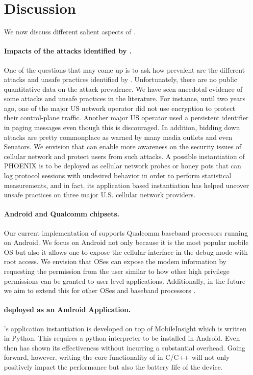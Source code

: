 \section{Discussion}
We now discuss different salient aspects of \system.
%


\paragraph{Impacts of the attacks identified by \system.}
One of the questions that may come up is to ask how prevalent
are the different attacks and unsafe practices identified by \system.
Unfortunately, there are no public quantitative data on the attack
prevalence. We have seen anecdotal evidence
of some attacks and unsafe practices
in the literature. For instance, until two years ago, one of the major
US network operator did not use  encryption to protect their control-plane traffic.
Another major US operator used a persistent identifier in paging messages even though
this is discouraged. In addition, bidding down attacks are pretty commonplace
as warned by many media outlets and even Senators. We envision that \system can enable
more awareness on the security issues of cellular network and protect users from
such attacks. A possible instantiation of PHOENIX is to be deployed as cellular
network probes or honey pots that can log protocol sessions with undesired
behavior in order to perform statistical measurements, and in fact, its
application based instantiation has helped uncover unsafe practices on three
major U.S. cellular network providers.



\paragraph{Android and Qualcomm chipsets.}
Our current implementation of \system supports Qualcomm
baseband processors running on Android. We focus on Android
not only because it is the most popular mobile OS but also
it allows one to expose the cellular interface in the debug
mode with root access. We envision that OSes can expose the modem
information by requesting the permission from the user similar to how
other high privilege permissions can be granted to user
level applications. Additionally, in the future
we aim to extend this for other OSes
and baseband processors \cite{SCAT}.

\paragraph{\system deployed as an Android Application.}
\system{}'s application instantiation
is developed on top of MobileInsight which is written in Python.
This requires a python interpreter to be installed in Android.
Even then \system has shown its effectiveness without incurring a substantial
overhead. Going forward, however, writing the core functionality of \system in
C/C++ will not only positively
impact the performance but also the battery life of the device.




